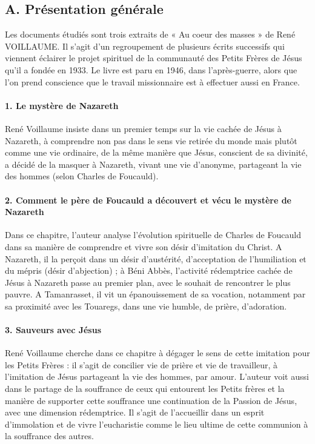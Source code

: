 \subsection{A. Présentation générale
}
Les documents étudiés sont trois extraits de « Au coeur des masses » de René VOILLAUME. Il s’agit d’un regroupement de plusieurs écrits successifs qui viennent éclairer le projet spirituel de la communauté des Petits Frères de Jésus qu’il a fondée en 1933. Le livre est paru en 1946, dans l’après-guerre, alors que l’on prend conscience que le travail missionnaire est à effectuer aussi en France.
\paragraph{1. Le mystère de Nazareth}

René Voillaume insiste dans un premier temps sur la vie cachée de Jésus à Nazareth, à comprendre non pas dans le sens vie retirée du monde mais plutôt comme une vie ordinaire, de la même manière que Jésus, conscient de sa divinité, a décidé de la masquer à Nazareth, vivant une vie d’anonyme, partageant la vie des hommes (selon Charles de Foucauld).
\paragraph{2. Comment le père de Foucauld a découvert et vécu le mystère de Nazareth}
Dans ce chapitre, l’auteur analyse l’évolution spirituelle de Charles de Foucauld dans sa manière de comprendre et vivre son désir d’imitation du Christ. A Nazareth, il la perçoit dans un désir d’austérité, d’acceptation de l’humiliation et du mépris (désir d’abjection) ; à Béni Abbès, l’activité rédemptrice cachée de Jésus à Nazareth passe au premier plan, avec le souhait de rencontrer le plus pauvre. A Tamanrasset, il vit un épanouissement de sa vocation, notamment par sa proximité avec les Touaregs, dans une vie humble, de prière, d’adoration.
\paragraph{3. Sauveurs avec Jésus
}
René Voillaume cherche dans ce chapitre à dégager le sens de cette imitation pour les Petits Frères : il s’agit de concilier vie de prière et vie de travailleur, à l’imitation de Jésus partageant la vie des hommes, par amour. L’auteur voit aussi dans le partage de la souffrance de ceux qui entourent les Petits frères et la manière de supporter cette souffrance une continuation de la Passion de Jésus, avec une dimension rédemptrice. Il s’agit de l’accueillir dans un esprit d’immolation et de vivre l’eucharistie comme le lieu ultime de cette communion à la souffrance des autres.

